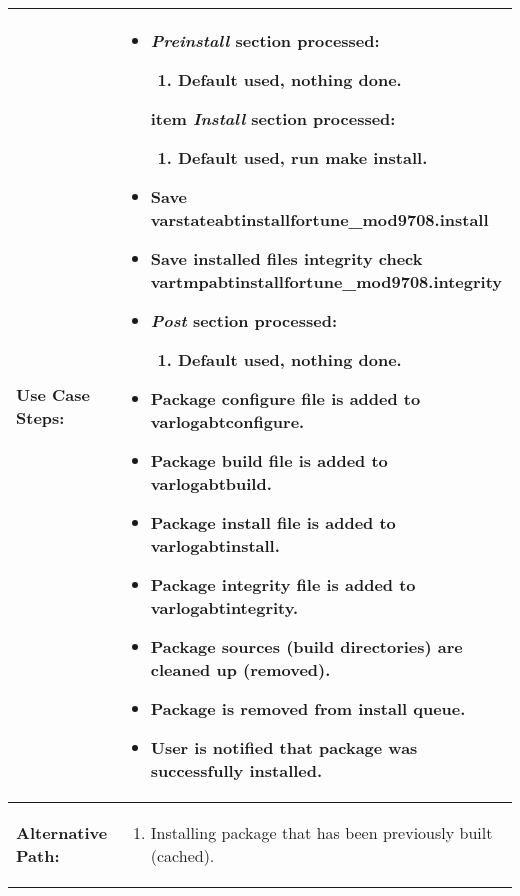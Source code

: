 \begin{tabularx}{\linewidth}{|l|X|}
\hline
\textbf{Use Case Steps:} & 
\begin{minipage}{\linewidth}
  \vspace{0.05em}
  \begin{itemize}
    \item \emph{Preinstall} section processed:
    \begin{enumerate}
      \item Default used, nothing done.
    \end{enumerate}
    item \emph{Install} section processed:
    \begin{enumerate}
      \item Default used, run \textbf{make install}.
    \end{enumerate}
    \item Save \/var\/state\/abt\/install\/fortune\_mod\-9708.install
    \item Save installed files integrity check \/var\/tmp\/abt\/install\/fortune\_mod\-9708.integrity
    \item \emph{Post} section processed:
    \begin{enumerate}
      \item Default used, nothing done.
    \end{enumerate}
    \item Package configure file is added to \/var\/log\/abt\/configure\/.
    \item Package build file is added to \/var\/log\/abt\/build\/.
    \item Package install file is added to \/var\/log\/abt\/install\/.
    \item Package integrity file is added to \/var\/log\/abt\/integrity\/.
    \item Package sources (build directories) are cleaned up (removed).
    \item Package is removed from install queue.
    \item User is notified that package was successfully installed.
  \end{itemize}
  \vspace{0.05em}
\end{minipage}
\\
\hline 
\textbf{Alternative Path:} &
\begin{minipage}{\linewidth}
  \vspace{0.05em} 
  \begin{enumerate}
    \item Installing package that has been previously built (cached).
  \end{enumerate}
  \vspace{0.05em} 
\end{minipage}
\\
\hline
\end{tabularx}

\newpage



